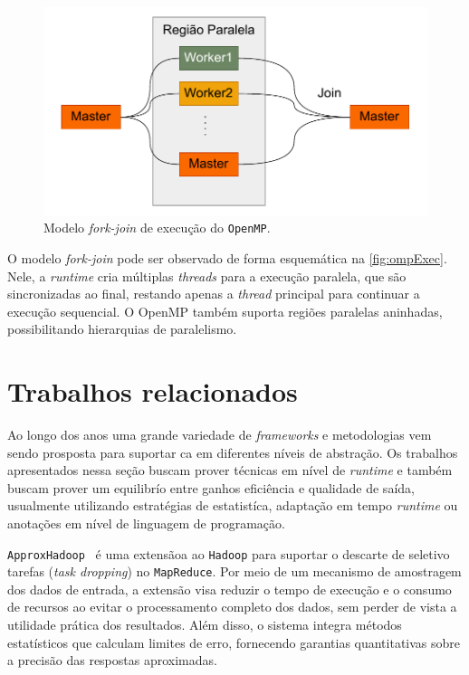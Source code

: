 \begin{figure}[htb]
    \caption{Modelo \textit{fork-join} de execução do \texttt{OpenMP}.}
    \label{fig:ompExec}
    \includegraphics[scale=0.7]{Figuras/omp_exec.pdf}
    \fonte{}
\end{figure}

O modelo \textit{fork-join} pode ser observado de forma esquemática na \autoref{fig:ompExec}. Nele, a \textit{runtime} cria múltiplas \textit{threads} para a execução paralela, que são sincronizadas ao final, restando apenas a \textit{thread} principal para continuar a execução sequencial. O OpenMP também suporta regiões paralelas aninhadas, possibilitando hierarquias de paralelismo.

\section{Trabalhos relacionados}\label{sec:trabRelac}

Ao longo dos anos uma grande variedade de \textit{frameworks} e metodologias vem sendo prosposta para suportar \gls{ca} em diferentes níveis de abstração. Os trabalhos apresentados nessa seção buscam prover técnicas em nível de \textit{runtime} e também buscam prover um equilibrío entre ganhos eficiência e qualidade de saída, usualmente utilizando estratégias de estatistíca, adaptação em tempo \textit{runtime} ou anotações em nível de linguagem de programação.

\texttt{ApproxHadoop}~\cite{goiri2015} é uma extensãoa ao \texttt{Hadoop} para suportar o descarte de seletivo tarefas (\textit{task dropping}) no \texttt{MapReduce}. Por meio de um mecanismo de amostragem dos dados de entrada, a extensão visa reduzir o tempo de execução e o consumo de recursos ao evitar o processamento completo dos dados, sem perder de vista a utilidade prática dos resultados. Além disso, o sistema integra métodos estatísticos que calculam limites de erro, fornecendo garantias quantitativas sobre a precisão das respostas aproximadas.

